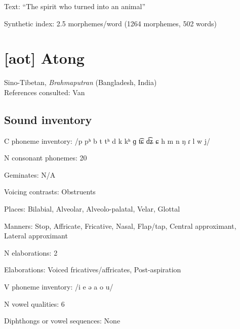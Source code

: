 {\begin{appendixdesc}

\item[Text:] “The spirit who turned into an animal” \citep[323--331]{Bruce1984}

\item[Synthetic index:] 2.5 morphemes/word (1264 morphemes, 502 words)

\end{appendixdesc}
\section*{[aot] Atong}  %
Sino-Tibetan, \textit{Brahmaputran} (Bangladesh, India)\medskip\\
References consulted: Van \citet{Breugel2008}

\subsection*{Sound inventory}
\begin{appendixdesc}

\item[C phoneme inventory:] /p pʰ b t tʰ d k kʰ ɡ t͡ɕ d͡ʑ ɕ h m n ŋ ɾ l w j/

\item[N consonant phonemes:] 20

\item[Geminates:] N/A

\item[Voicing contrasts:] Obstruents

\item[Places:] Bilabial, Alveolar, Alveolo-palatal, Velar, Glottal

\item[Manners:] Stop, Affricate, Fricative, Nasal, Flap/tap, Central approximant, Lateral approximant

\item[N elaborations:] 2

\item[Elaborations:] Voiced fricatives/affricates, Post-aspiration

\item[V phoneme inventory:] /i e ə a o u/

\item[N vowel qualities:] 6

\item[Diphthongs or vowel sequences:] None


\end{appendixdesc}}
